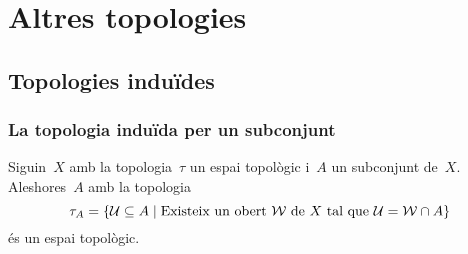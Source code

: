 \documentclass[../topologia.tex]{subfiles}
\begin{document}
\chapter{Altres topologies}
\section{Topologies induïdes}
    \subsection{La topologia induïda per un subconjunt}
    \begin{proposition}
        \label{prop:topologia-induida-per-un-subconjunt}
        Siguin~\(X\) amb la topologia~\(\tau\) un espai topològic i~\(A\) un subconjunt de~\(X\).
        Aleshores~\(A\) amb la topologia
        \begin{equation}
            \label{prop:topologia-induida-per-un-subconjunt:eq1}
            \tau_{A}=\{\mathcal{U}\subseteq A\mid\text{Existeix un obert }\mathcal{W}\text{ de }X\text{ tal que }\mathcal{U}=\mathcal{W}\cap A\}
        \end{equation}
        és un espai topològic.
    \end{proposition}
\end{document}
